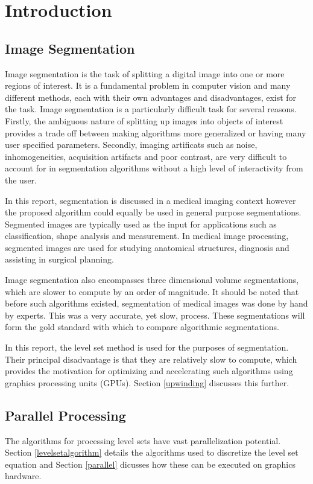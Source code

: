 \chapter{Introduction}

\section{Image Segmentation}
Image segmentation is the task of splitting a digital image into one or more regions of interest. It is a fundamental problem in computer vision and many different methods, each with their own advantages and disadvantages, exist for the task. Image segmentation is a particularly difficult task for several reasons. Firstly, the ambiguous nature of splitting up images into objects of interest provides a trade off between making algorithms more generalized or having many user specified parameters. Secondly, imaging artificats such as noise, inhomogeneities, acquisition artifacts and poor contrast, are very difficult to account for in segmentation algorithms without a high level of interactivity from the user. 

In this report, segmentation is discussed in a medical imaging context however the proposed algorithm could equally be used in general purpose segmentations. Segmented images are typically used as the input for applications such as classification, shape analysis and measurement. In medical image processing, segmented images are used for studying anatomical structures, diagnosis and assisting in surgical planning.

Image segmentation also encompasses three dimensional volume segmentations, which are slower to compute by an order of magnitude. It should be noted that before such algorithms existed, segmentation of medical images was done by hand by experts. This was a very accurate, yet slow, process. These segmentations will form the gold standard with which to compare algorithmic segmentations.

In this report, the level set method is used for the purposes of segmentation. Their principal disadvantage is that they are relatively slow to compute, which provides the motivation for optimizing and accelerating such algorithms using graphics processing units (GPUs). Section \ref{upwinding} discusses this further.



\section{Parallel Processing}
The algorithms for processing level sets have vast parallelization potential. Section \ref{levelsetalgorithm} details the algorithms used to discretize the level set equation and Section \ref{parallel} dicusses how these can be executed on graphics hardware.
